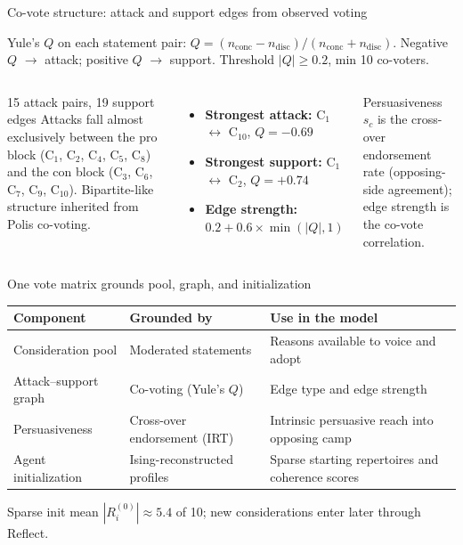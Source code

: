 \documentclass[aspectratio=169,11pt]{beamer}
\begin{document}
\begin{frame}{Co-vote structure: attack and support edges from observed voting}

Yule's $Q$ on each statement pair: $Q = (n_{\text{conc}} - n_{\text{disc}}) / (n_{\text{conc}} + n_{\text{disc}})$.
Negative $Q$ $\to$ attack; positive $Q$ $\to$ support. Threshold $|Q| \geq 0.2$, min 10 co-voters.

\vspace{0.3cm}
\begin{columns}[c]
\begin{block}{15 attack pairs, 19 support edges}
{\small Attacks fall almost exclusively between the pro block (C$_1$, C$_2$, C$_4$, C$_5$, C$_8$) and the con block (C$_3$, C$_6$, C$_7$, C$_9$, C$_{10}$). Bipartite-like structure inherited from Polis co-voting.}
\end{block}

\begin{itemize}
    \item \textbf{Strongest attack:} C$_1$ $\leftrightarrow$ C$_{10}$, $Q = -0.69$
    \item \textbf{Strongest support:} C$_1$ $\leftrightarrow$ C$_2$, $Q = +0.74$
    \item \textbf{Edge strength:} $0.2 + 0.6 \times \min(|Q|, 1)$
\end{itemize}

\vspace{0.2cm}
{\small Persuasiveness $s_c$ is the cross-over endorsement rate (opposing-side agreement); edge strength is the co-vote correlation.}
\end{columns}

\end{frame}

\begin{frame}{One vote matrix grounds pool, graph, and initialization}

\begin{table}
\centering
\small
\begin{tabular}{lll}
\toprule
\textbf{Component} & \textbf{Grounded by} & \textbf{Use in the model} \\
\midrule
Consideration pool & Moderated statements & Reasons available to voice and adopt \\
Attack--support graph & Co-voting (Yule's $Q$) & Edge type and edge strength \\
Persuasiveness & Cross-over endorsement (IRT) & Intrinsic persuasive reach into opposing camp \\
Agent initialization & Ising-reconstructed profiles & Sparse starting repertoires and coherence scores \\
\bottomrule
\end{tabular}
\end{table}

\vspace{0.3cm}
{\small Sparse init mean $|R_i^{(0)}| \approx 5.4$ of 10; new considerations enter later through Reflect.}

\end{frame}
\end{document}
